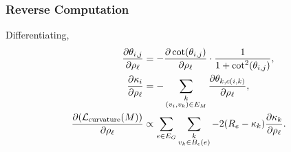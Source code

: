 \subsubsection{Reverse Computation}
Differentiating, \begin{align*}
	\frac{\partial\theta_{i, j}}{\partial\rho_\ell} &= -\frac{\partial \cot\pof{\theta_{i, j}}}{\partial \rho_\ell} \cdot \frac{1}{1 + \cot^2\pof{\theta_{i, j}}}, \\
	\frac{\partial\kappa_i}{\partial\rho_\ell} &= -\sum_{\substack{k \\ \pof{v_i, v_k} \in E_M}} \frac{\partial\theta_{k, c\pof{i, k}}}{\partial\rho_\ell}, \\
	\frac{\partial\pof{\mathcal{L}_{\mathrm{curvature}}\pof{M}}}{\partial\rho_\ell} &\propto \sum_{e \in E_G} \sum_{\substack{k \\ v_k \in B_\epsilon\pof{e}}} -2\pof{R_e - \kappa_k}\frac{\partial\kappa_k}{\partial\rho_\ell}.
\end{align*}
